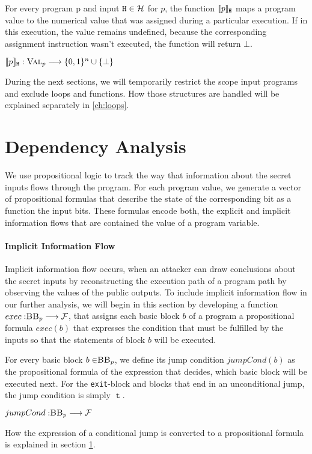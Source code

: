 \begin{definition}
For every program p and input $\mathtt{H} \in \mathcal{H}$ for $p$, the function $\llbracket p \rrbracket_{\mathtt{H}}$ maps a program value to the numerical value that was assigned during a particular execution. If in this execution, the value remains undefined, because the corresponding assignment instruction wasn't executed, the function will return $\bot$.
    \begin{center}
        $\llbracket p \rrbracket_{\mathtt{H}}: \textsc{Val}_p \longrightarrow \{0, 1\}^n \cup \{\bot\}$
    \end{center}
\end{definition}

During the next sections, we will temporarily restrict the scope input programs and exclude loops and functions. How those structures are handled will be explained separately in \ref{ch:loops}.

\section{Dependency Analysis}\label{sec:prop}

We use propositional logic to track the way that information about the secret inputs flows through the program. For each program value, we generate a vector of propositional formulas that describe the state of the corresponding bit as a function the input bits. These formulas encode both, the explicit and implicit information flows that are contained the value of a program variable.

\paragraph{Implicit Information Flow}
Implicit information flow occurs, when an attacker can draw conclusions about the secret inputs by reconstructing the  execution path of a program path by observing the values of the public outputs. To include implicit information flow in our further analysis, we will begin in this section by developing a function $exec: \mbb_p \longrightarrow \mbform$, that assigns each basic block $b$ of a program a propositional formula $exec(b)$ that expresses the condition that must be fulfilled by the inputs so that the statements of block $b$ will be executed. 

\begin{definition}
    For every basic block $b \in \mbb_p$, we define its jump condition $jumpCond(b)$ as the propositional formula of the expression that decides, which basic block will be executed next. For the \texttt{exit}-block and blocks that end in an unconditional jump, the jump condition is simply $\mttt$.
    \begin{center}
        $jumpCond: \mbb_p \longrightarrow \mbform$
    \end{center}

    How the expression of a conditional jump is converted to a propositional formula is explained in section \ref{sec:prop}.
\end{definition}

